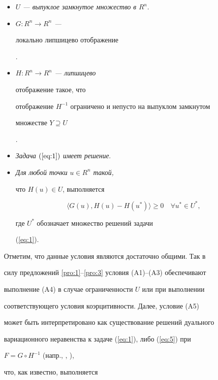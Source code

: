 \begin{itemize}


\item[(A1)] {\it $U$ --- выпуклое замкнутое множество в $R^{n}$}.


\item[(A2)] {\it $G:R^{n} \rightarrow R^{n}$ ---


локально липшицево отображение}.


\item[(A3)] {\it $H:R^{n} \rightarrow R^{n}$ --- липшицево


отображение такое, что 


отображение $H^{-1} $ ограничено и непусто на выпуклом замкнутом 


множестве $Y \supseteq U$}.


\item[(A4)] {\it Задача $(\ref{eq:1})$ имеет решение}.


\item[(A5)] {\it Для любой точки $u \in R^{n}$ такой,


что $H(u) \in U$, выполняется 


\begin{equation} \label{eq:8} 


\langle G(u), H(u) - H(u^{*}) \rangle \geq 0 \quad \forall u^{*} \in U^{*}, 


\end{equation}


где $U^{*} $ обозначает множество решений задачи} (\ref{eq:1}).


\end{itemize}





Отметим, что данные условия являются достаточно общими. Так в 


силу предложений \ref{pro:1}--\ref{pro:3} условия (A1)--(A3) обеспечивают 


выполнение (A4) в случае ограниченности $U$ или при выполнении 


соответствующего условия коэрцитивности. Далее, условие (A5) 


может быть интерпретировано как существование решений дуального 


вариационного неравенства к задаче (\ref{eq:1}), либо (\ref{eq:5}) при


$F=G \circ H^{-1}$ (напр., \cite{Kon93}, \cite{Kon98}),


что, как известно, выполняется 


